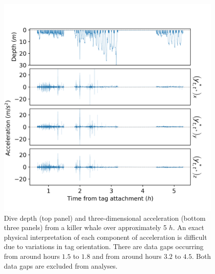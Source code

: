 
\begin{figure}[ht]
	\centering
	\includegraphics[width=5.25in]{../Plots/2019/20190902-182840-CATs_OB_1_0_267_CarHHMM2_raw_data.png}
	\caption{Dive depth (top panel) and three-dimensional acceleration (bottom three panels) from a killer whale over approximately 5 $h$. An exact physical interpretation of each component of acceleration is difficult due to variations in tag orientation. There are data gaps occurring from around hours $1.5$ to $1.8$ and from around hours $3.2$ to $4.5$. Both data gaps are excluded from analyses.}
	\label{fig:data}
\end{figure}


